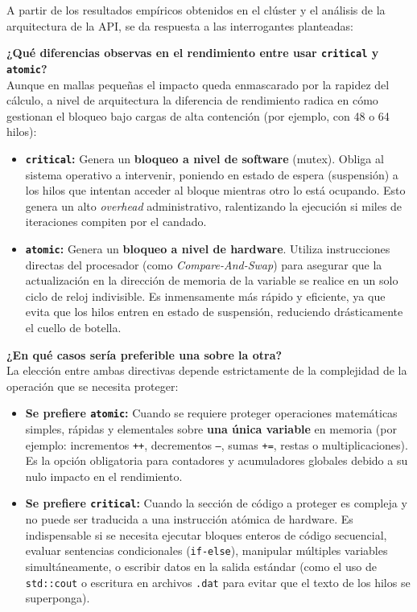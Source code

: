 A partir de los resultados empíricos obtenidos en el clúster y el análisis de la arquitectura de la API, se da respuesta a las interrogantes planteadas:

\textbf{¿Qué diferencias observas en el rendimiento entre usar \texttt{critical} y \texttt{atomic}?} \\
Aunque en mallas pequeñas el impacto queda enmascarado por la rapidez del cálculo, a nivel de arquitectura la diferencia de rendimiento radica en cómo gestionan el bloqueo bajo cargas de alta contención (por ejemplo, con 48 o 64 hilos):
\begin{itemize}
    \item \textbf{\texttt{critical}:} Genera un \textbf{bloqueo a nivel de software} (mutex). Obliga al sistema operativo a intervenir, poniendo en estado de espera (suspensión) a los hilos que intentan acceder al bloque mientras otro lo está ocupando. Esto genera un alto \textit{overhead} administrativo, ralentizando la ejecución si miles de iteraciones compiten por el candado.
    \item \textbf{\texttt{atomic}:} Genera un \textbf{bloqueo a nivel de hardware}. Utiliza instrucciones directas del procesador (como \textit{Compare-And-Swap}) para asegurar que la actualización en la dirección de memoria de la variable se realice en un solo ciclo de reloj indivisible. Es inmensamente más rápido y eficiente, ya que evita que los hilos entren en estado de suspensión, reduciendo drásticamente el cuello de botella.
\end{itemize}

\textbf{¿En qué casos sería preferible una sobre la otra?} \\
La elección entre ambas directivas depende estrictamente de la complejidad de la operación que se necesita proteger:
\begin{itemize}
    \item \textbf{Se prefiere \texttt{atomic}:} Cuando se requiere proteger operaciones matemáticas simples, rápidas y elementales sobre \textbf{una única variable} en memoria (por ejemplo: incrementos \texttt{++}, decrementos \texttt{--}, sumas \texttt{+=}, restas o multiplicaciones). Es la opción obligatoria para contadores y acumuladores globales debido a su nulo impacto en el rendimiento.
    \item \textbf{Se prefiere \texttt{critical}:} Cuando la sección de código a proteger es compleja y no puede ser traducida a una instrucción atómica de hardware. Es indispensable si se necesita ejecutar bloques enteros de código secuencial, evaluar sentencias condicionales (\texttt{if-else}), manipular múltiples variables simultáneamente, o escribir datos en la salida estándar (como el uso de \texttt{std::cout} o escritura en archivos \texttt{.dat} para evitar que el texto de los hilos se superponga).
\end{itemize}

